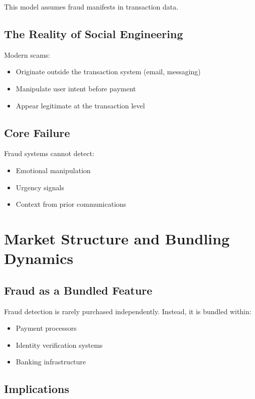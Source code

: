 \documentclass[11pt]{article}
\begin{document}
This model assumes fraud manifests in transaction data.

\subsection{The Reality of Social Engineering}

Modern scams:
\begin{itemize}
    \item Originate outside the transaction system (email, messaging)
    \item Manipulate user intent before payment
    \item Appear legitimate at the transaction level
\end{itemize}

\subsection{Core Failure}

Fraud systems cannot detect:
\begin{itemize}
    \item Emotional manipulation
    \item Urgency signals
    \item Context from prior communications
\end{itemize}

\section{Market Structure and Bundling Dynamics}

\subsection{Fraud as a Bundled Feature}

Fraud detection is rarely purchased independently. Instead, it is bundled within:
\begin{itemize}
    \item Payment processors
    \item Identity verification systems
    \item Banking infrastructure
\end{itemize}

\subsection{Implications}
\end{document}
